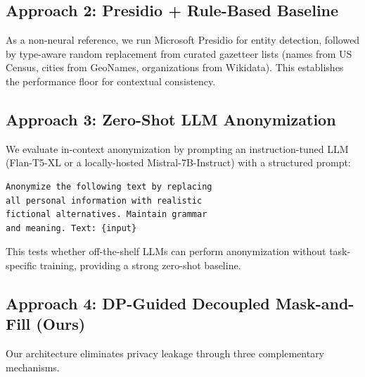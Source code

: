 \documentclass[9pt]{article}
\begin{document}
\subsection{Approach 2: Presidio + Rule-Based Baseline}

As a non-neural reference, we run Microsoft Presidio \cite{presidio2023} for entity detection, followed by type-aware random replacement from curated gazetteer lists (names from US Census, cities from GeoNames, organizations from Wikidata). This establishes the performance floor for contextual consistency.

\subsection{Approach 3: Zero-Shot LLM Anonymization}

We evaluate in-context anonymization by prompting an instruction-tuned LLM (Flan-T5-XL or a locally-hosted Mistral-7B-Instruct) with a structured prompt:
\begin{verbatim}
Anonymize the following text by replacing
all personal information with realistic
fictional alternatives. Maintain grammar
and meaning. Text: {input}
\end{verbatim}
This tests whether off-the-shelf LLMs can perform anonymization without task-specific training, providing a strong zero-shot baseline.

\subsection{Approach 4: DP-Guided Decoupled Mask-and-Fill (Ours)}

Our architecture eliminates privacy leakage through three complementary mechanisms.
\end{document}
